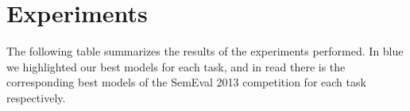 \section{Experiments}

The following table summarizes the results of the experiments performed. In blue we highlighted our best models for each task, and in read there is the corresponding best models of the SemEval 2013 competition for each task respectively.



